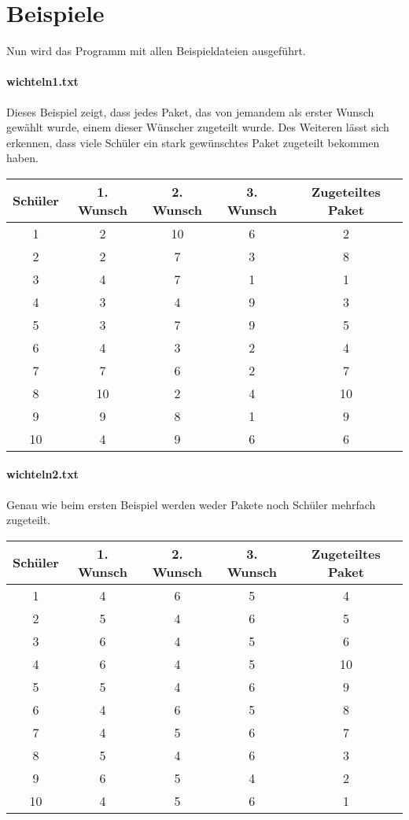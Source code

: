 \documentclass[a4paper,10pt,ngerman]{scrartcl}
\begin{document}
\section{Beispiele}

Nun wird das Programm mit allen Beispieldateien ausgeführt.

\paragraph{wichteln1.txt}
Dieses Beispiel zeigt, dass jedes Paket, das von jemandem als erster Wunsch gewählt wurde, einem dieser Wünscher zugeteilt wurde.
Des Weiteren lässt sich erkennen, dass viele Schüler ein stark gewünschtes Paket zugeteilt bekommen haben.
\begin{longtable}[c]{c|c|c|c|c}
    Schüler & 1. Wunsch & 2. Wunsch & 3. Wunsch & Zugeteiltes Paket \\
    \hline
    \endhead
    1 & 2 & 10 & 6 & 2 \\
    2 & 2 & 7 & 3 & 8 \\
    3 & 4 & 7 & 1 & 1 \\
    4 & 3 & 4 & 9 & 3 \\
    5 & 3 & 7 & 9 & 5 \\
    6 & 4 & 3 & 2 & 4 \\
    7 & 7 & 6 & 2 & 7 \\
    8 & 10 & 2 & 4 & 10 \\
    9 & 9 & 8 & 1 & 9 \\
    10 & 4 & 9 & 6 & 6
\end{longtable}

\paragraph{wichteln2.txt}
Genau wie beim ersten Beispiel werden weder Pakete noch Schüler mehrfach zugeteilt.
\begin{longtable}[c]{c|c|c|c|c}
    Schüler & 1. Wunsch & 2. Wunsch & 3. Wunsch & Zugeteiltes Paket \\
    \hline
    \endhead
    1 & 4 & 6 & 5 & 4 \\
    2 & 5 & 4 & 6 & 5 \\
    3 & 6 & 4 & 5 & 6 \\
    4 & 6 & 4 & 5 & 10 \\
    5 & 5 & 4 & 6 & 9 \\
    6 & 4 & 6 & 5 & 8 \\
    7 & 4 & 5 & 6 & 7 \\
    8 & 5 & 4 & 6 & 3 \\
    9 & 6 & 5 & 4 & 2 \\
    10 & 4 & 5 & 6 & 1
\end{longtable}
\end{document}
